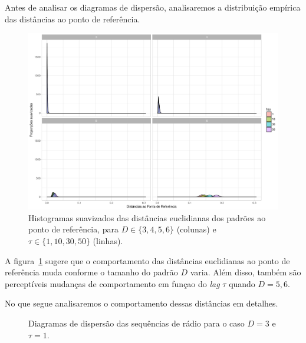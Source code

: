 Antes de analisar os diagramas de dispersão, analisaremos a distribuição empírica das distâncias ao ponto de referência.

\begin{figure}[hbt]
	\centering
	\includegraphics[width=\linewidth]{../Plots/HistoDistanciasRandTodas}
	\caption{Histogramas suavizados das distâncias euclidianas dos padrões ao ponto de referência, para $D\in\{3,4,5,6\}$ (colunas) e $\tau\in\{1,10,30,50\}$ (linhas).}\label{Fig:HistoDistanciasRandTodas}
\end{figure}

A figura~\ref{Fig:HistoDistanciasRandTodas} sugere que o comportamento das distâncias euclidianas ao ponto de referência muda conforme o tamanho do padrão $D$ varia.
Além disso, também são perceptíveis mudanças de comportamento em funçao do \textit{lag} $\tau$ quando $D=5,6$.

No que segue analisaremos o comportamento dessas distâncias em detalhes.


\begin{figure}
	\centering
	\caption{Diagramas de dispersão das sequências de rádio para o caso $D=3$ e $\tau=1$.}\label{Fig:QuantD3tau1}
\end{figure}

